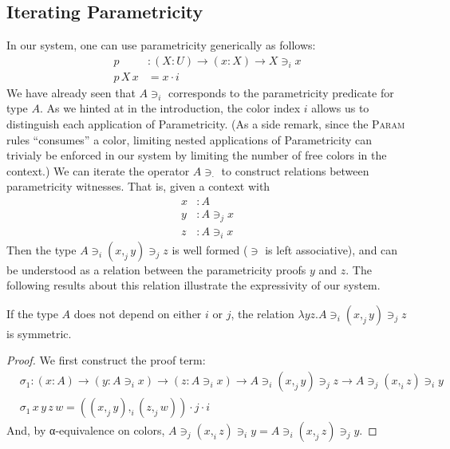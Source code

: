 \documentclass[english]{PaperTools/latex/lipics}
\newcommand\CP[3]{(#2,_{#1} #3)}
\newcommand\param[1]{\!\cdot\!#1}
\newcommand\op[1]{∋_{#1}}
\begin{document}
\subsection{Iterating Parametricity}
In our system, one can use parametricity generically as follows:
\begin{align*}
p &: (X:U) → (x:X) → X \op i x\\
p\, X\, x &= x\param i
\end{align*}
We have already seen that $A \op i $ corresponds to the parametricity
predicate for type $A$.
As we hinted at in the introduction, the color index $i$ allows us to
distinguish each application of Parametricity.  (As a side remark, since
the \textsc{Param} rules ``consumes'' a color, limiting nested
applications of Parametricity can trivialy be enforced in our system by
limiting the number of free colors in the context.)
We can iterate the operator $A \op {·} $ to construct
relations between parametricity witnesses. That is, given a context with
\begin{align*}
  x & :A \\
  y & : A \op j x\\
  z & : A \op i x
\end{align*}
Then the type $A \op i \CP j x y \op j z$ is well formed ($∋$ is left
associative), and can be understood as a relation
between the parametricity proofs $y$ and $z$. The following results about this relation illustrate the expressivity of our system.
\begin{theorem}
If the type $A$ does not depend on either $i$ or $j$, the relation $λy z. A \op i \CP j x y \op j z$ is symmetric.
\end{theorem}
\begin{proof}
  We first construct the proof term:
  \begin{align*}
    &\sigma_1 : (x:A) → (y : A \op i x) → (z : A \op i x) → A \op i \CP j x y \op j z → A \op j \CP i x z \op i y \\
    &\sigma_1\, x\, y\, z\, w = \CP i {\CP j x y}{\CP j z w} \param j \param i
  \end{align*}
  And, by α-equivalence on colors, $A \op j \CP i x z \op i y = A \op i \CP j x z \op j y$.
\end{proof}
\end{document}
